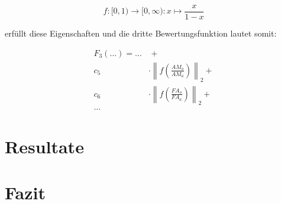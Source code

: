 \documentclass[a4paper,12pt]{article}
\begin{document}
\begin{equation*}
f: [0,1) \rightarrow [0,\infty) : x \mapsto \frac{x}{1-x}
\end{equation*}

erfüllt diese Eigenschaften und die dritte Bewertungsfunktion lautet somit:

\begin{align*}
F_3(\hdots) = \hdots & \hspace{4pt} + \\
			c_5 &\cdot \left\| f\left( \frac{AM_o}{AM_a} \right) \right\|_2 +\\
			c_6 &\cdot \left\| f\left( \frac{FA_o}{FA_a} \right) \right\|_2 +\\
			 \hdots &
\end{align*}


%

\section{Resultate}

\section{Fazit}
\end{document}
